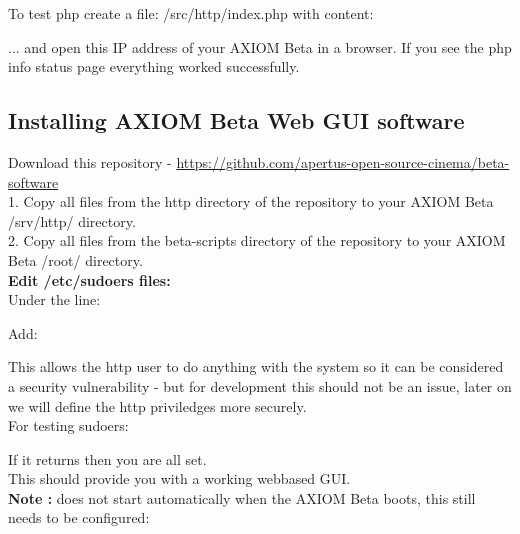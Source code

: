 To test php create a file: /src/http/index.php with content:

    
... and open this IP address of your AXIOM Beta in a browser. If you see the php info status page everything worked successfully.     






\subsection{Installing AXIOM Beta Web GUI software}

Download this repository - \href{https://github.com/apertus-open-source-cinema/beta-software}{https://github.com/apertus-open-source-cinema/beta-software}\\

1. Copy all files from the http directory of the repository to your AXIOM Beta /srv/http/ directory.\\
2. Copy all files from the beta-scripts directory of the repository to your AXIOM Beta /root/ directory.\\ 

\textbf{Edit /etc/sudoers files:}\\

Under the line: 


Add:


This allows the http user to do anything with the system so it can be considered a security vulnerability - but for development this should not be an issue, later on we will define the http priviledges more securely.\\

For testing sudoers: 


If it returns  then you are all set.\\

This should provide you with a working webbased GUI.\\

\textbf{Note :}  does not start automatically when the AXIOM Beta boots, this still needs to be configured: 


